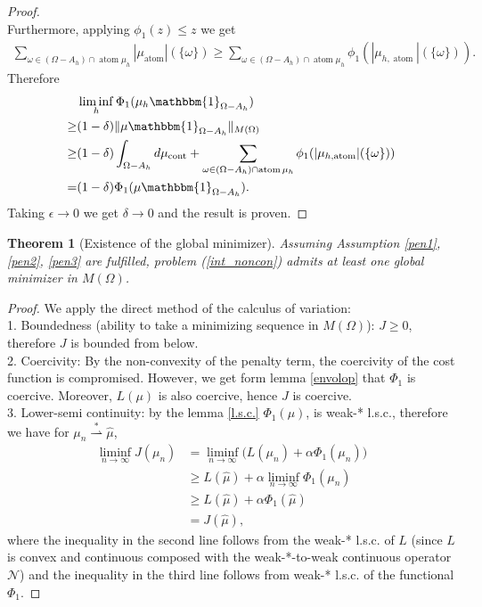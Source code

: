 \documentclass[12pt,fleqn]{amsart}
\newtheorem{theorem}{Theorem}[section]
\theoremstyle{definition}
\DeclareMathOperator*{\atom}{atom}
\DeclareMathOperator*{\cont}{cont}
\begin{document}
\begin{proof}
\begin{equation*}
	\end{equation*}
	Furthermore, applying $\phi_1(z) \le z$ we get
	\begin{align*}
		\sum_{\omega \in (\Omega - A_h) \cap \atom \mu_h}  |\mu_{\atom}|(\{\omega\})
		\ge \sum_{\omega \in (\Omega - A_h) \cap \atom \mu_h} \phi_1(|\mu_{h, \atom}|(\{\omega\})).
	\end{align*}
	Therefore
	\begin{equation*}
		\begin{aligned}
			& \liminf_h \Phi_1(\mu_h \mathbbm{1}_{\Omega - A_h})\\
			\ge & (1 - \delta) \|\mu \mathbbm{1}_{\Omega - A_h}\|_{M(\Omega)}\\
			\ge & (1 - \delta)\int_{\Omega - A_h} d\mu_{\cont} + \sum_{\omega \in (\Omega - A_h) \cap \atom \mu_h} \phi_1(|\mu_{h, \atom}|(\{\omega\}))\\
			= & (1 - \delta) \Phi_1(\mu \mathbbm{1}_{\Omega - A_h}).
		\end{aligned}
	\end{equation*}
Taking $\epsilon \rightarrow 0$ we get $\delta \rightarrow 0$ and the result is proven. 
\end{proof}

\begin{theorem}[Existence of the global minimizer]
Assuming Assumption \ref{pen1}, \ref{pen2}, \ref{pen3} are fulfilled, problem (\ref{int_noncon}) admits at least one global minimizer in $M(\Omega)$. 
\end{theorem}
\begin{proof}
We apply the direct method of the calculus of variation:\\ 
1. Boundedness (ability to take a minimizing sequence in $M(\Omega)$): $J \ge 0$, therefore $J$ is bounded from below.\\
2. Coercivity: By the non-convexity of the penalty term, the coercivity of the cost function is compromised. 
However, we get form lemma \ref{envolop} that $\Phi_1$ is coercive. 
Moreover, $L(\mu)$ is also coercive, hence $J$ is coercive. \\
3. Lower-semi continuity: by the lemma \ref{l.s.c.}  $\Phi_1(\mu)$, is weak-* l.s.c., therefore we have for $\mu_n \overset{*}{\rightharpoonup} \hat{\mu}$,
\begin{align*}
\liminf_{n \rightarrow \infty } J(\mu_n) &= \liminf_{n \rightarrow \infty} \bigg( L(\mu_n)  + \alpha \Phi_1(\mu_n) \bigg)\\
&\ge L(\hat{\mu}) + \alpha \liminf_{n \rightarrow \infty} \Phi_1(\mu_n)\\
& \ge L(\hat{\mu}) + \alpha\Phi_1(\hat{\mu})\\
& = J(\hat{\mu}),
\end{align*}
where the inequality in the second line follows from the weak-* l.s.c. of $L$ (since $L$ is convex and continuous composed with the weak-*-to-weak continuous operator $\mathcal{N}$) and the inequality in the third line follows from weak-* l.s.c. of the functional $\Phi_1$.
\end{proof}
 
\end{document}
